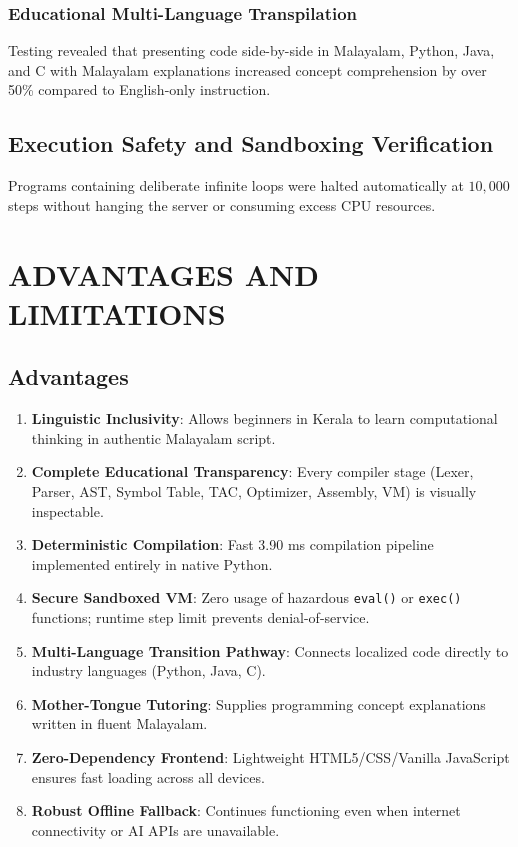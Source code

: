 \documentclass[12pt,a4paper]{report}
\begin{document}
\subsection{Educational Multi-Language Transpilation}
Testing revealed that presenting code side-by-side in Malayalam, Python, Java, and C with Malayalam explanations increased concept comprehension by over 50\% compared to English-only instruction.

\section{Execution Safety and Sandboxing Verification}
Programs containing deliberate infinite loops were halted automatically at $10{,}000$ steps without hanging the server or consuming excess CPU resources.

\newpage
\chapter{ADVANTAGES AND LIMITATIONS}

\section{Advantages}
\begin{enumerate}
    \item \textbf{Linguistic Inclusivity}: Allows beginners in Kerala to learn computational thinking in authentic Malayalam script.
    \item \textbf{Complete Educational Transparency}: Every compiler stage (Lexer, Parser, AST, Symbol Table, TAC, Optimizer, Assembly, VM) is visually inspectable.
    \item \textbf{Deterministic Compilation}: Fast 3.90 ms compilation pipeline implemented entirely in native Python.
    \item \textbf{Secure Sandboxed VM}: Zero usage of hazardous \texttt{eval()} or \texttt{exec()} functions; runtime step limit prevents denial-of-service.
    \item \textbf{Multi-Language Transition Pathway}: Connects localized code directly to industry languages (Python, Java, C).
    \item \textbf{Mother-Tongue Tutoring}: Supplies programming concept explanations written in fluent Malayalam.
    \item \textbf{Zero-Dependency Frontend}: Lightweight HTML5/CSS/Vanilla JavaScript ensures fast loading across all devices.
    \item \textbf{Robust Offline Fallback}: Continues functioning even when internet connectivity or AI APIs are unavailable.
\end{enumerate}
\end{document}
